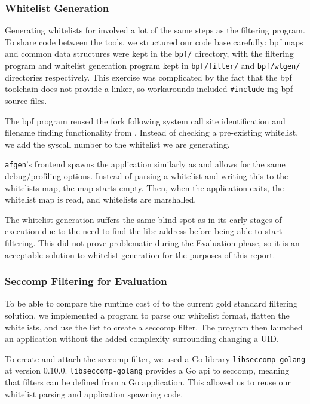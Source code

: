\subsubsection{Whitelist Generation}\label{subsubsec:impl-whitelist-gen}

Generating whitelists for \af involved a lot of the same steps as the filtering
program. To share code between the tools, we structured our code base carefully:
\ac{bpf} maps and common data structures
were kept in the \texttt{bpf/} directory, with the filtering program and
whitelist generation program kept in \texttt{bpf/filter/} and
\texttt{bpf/wlgen/} directories respectively. This exercise was complicated by
the fact that the \ac{bpf} toolchain does not provide a linker, so workarounds
included \texttt{\#include}-ing \ac{bpf} source files.

The \ac{bpf} program reused the fork following system call site identification and
filename finding functionality from \af. Instead of checking a pre-existing 
whitelist, we add the syscall number to the whitelist we are generating. 

\texttt{afgen}'s frontend spawns the application similarly as \af and allows for
the same debug/profiling options. Instead of parsing a
whitelist and writing this to the whitelists map, the map starts empty. Then,
when the application exits, the whitelist map is read, and whitelists are
marshalled.

The whitelist generation suffers the same blind spot as \af in its early stages
of execution due to the need to find the \ac{libc} address before being able to
start filtering. This did not prove problematic during the Evaluation phase, so
it is an acceptable solution to whitelist generation for the purposes of this
report. 

\subsubsection{Seccomp Filtering for Evaluation}\label{subsubsec:syso-impl}

To be able to compare the runtime cost of \af to the current gold standard
filtering solution, we implemented a program to parse our whitelist format,
flatten the whitelists, and use the list to create a seccomp filter. The program
then launched an application without the added complexity surrounding changing
a UID.

To create and attach the seccomp filter, we used a Go library 
\texttt{libseccomp-golang} at version 0.10.0. \texttt{libseccomp-golang}
provides a Go \ac{api} to seccomp, meaning that filters can be defined from a
Go application. This allowed us to reuse our whitelist parsing and application
spawning code.

